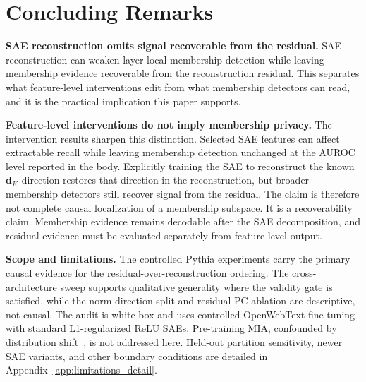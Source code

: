 \documentclass{article}
\theoremstyle{plain}
\theoremstyle{definition}
\theoremstyle{remark}
\newcommand{\dK}{\mathbf{d}_K}
\begin{document}





\section{Concluding Remarks}
\label{sec:concluding}

\textbf{SAE reconstruction omits signal recoverable from the residual.}
SAE reconstruction can weaken layer-local membership detection while leaving membership evidence recoverable from the reconstruction residual. This separates what feature-level interventions edit from what membership detectors can read, and it is the practical implication this paper supports.

\textbf{Feature-level interventions do not imply membership privacy.}
The intervention results sharpen this distinction. Selected SAE features can affect extractable recall while leaving membership detection unchanged at the AUROC level reported in the body. Explicitly training the SAE to reconstruct the known $\dK$ direction restores that direction in the reconstruction, but broader membership
detectors still recover signal from the residual. The claim is therefore not complete causal localization of a membership subspace. It is a recoverability
claim. Membership evidence remains decodable after the SAE decomposition, and residual evidence must be evaluated separately from feature-level output.

\textbf{Scope and limitations.}
The controlled Pythia experiments carry the primary causal evidence for the residual-over-reconstruction ordering. The cross-architecture sweep supports qualitative generality where the validity gate is satisfied, while the norm-direction split and residual-PC ablation are descriptive, not causal. The audit is white-box and uses controlled OpenWebText fine-tuning with standard L1-regularized ReLU SAEs. Pre-training MIA, confounded by distribution shift~\citep{maini2024dataset, duan2024membership}, is not addressed here. Held-out partition sensitivity, newer SAE variants, and other boundary conditions are detailed in Appendix~\ref{app:limitations_detail}.




\appendix

\end{document}
